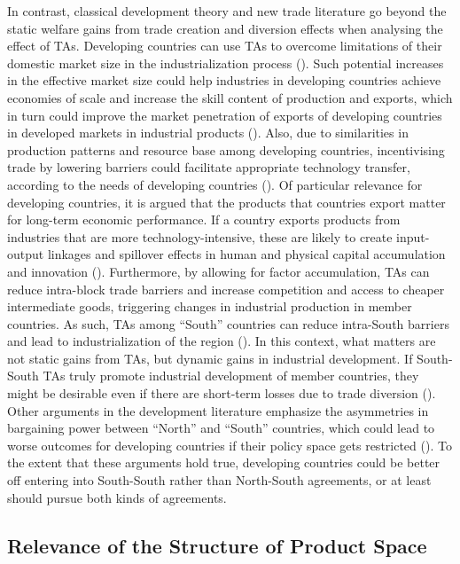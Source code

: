 %
In contrast, classical development theory and new trade literature go
beyond the static welfare gains from trade creation and diversion
effects when analysing the effect of TAs. Developing countries can use
TAs to overcome limitations of their domestic market size in the
industrialization process (\cite{dahi_preferential_2013}). Such potential
increases in the effective market size could help industries in
developing countries achieve economies of scale and increase the skill
content of production and exports, which in turn could improve the
market penetration of exports of developing countries in developed
markets in industrial products (\cite{fugazza_can_2006}). Also,
due to similarities in production patterns and resource base among
developing countries, incentivising trade by lowering barriers could
facilitate appropriate technology transfer, according to the needs of
developing countries (\cite{unido_industrial_2006}). Of particular relevance for
developing countries, it is argued that the products that countries
export matter for long-term economic performance. If a country exports
products from industries that are more technology-intensive, these are
likely to create input-output linkages and spillover effects in human
and physical capital accumulation and innovation (\cite{hausmann_what_2007}). Furthermore, by allowing for factor accumulation, TAs can
reduce intra-block trade barriers and increase competition and access to
cheaper intermediate goods, triggering changes in industrial production
in member countries. As such, TAs among ``South'' countries can reduce
intra-South barriers and lead to industrialization of the region (\cite{puga_trading_1998}). In this context, what matters are not static gains
from TAs, but dynamic gains in industrial development. If South-South
TAs truly promote industrial development of member countries, they might
be desirable even if there are short-term losses due to trade diversion
(\cite{dahi_preferential_2013}). Other arguments in the development literature
emphasize the asymmetries in bargaining power between ``North'' and
``South'' countries, which could lead to worse outcomes for developing
countries if their policy space gets restricted (\cite{thrasher_21st_2008}). To the extent that these arguments hold true, developing
countries could be better off entering into South-South rather than
North-South agreements, or at least should pursue both kinds of
agreements.

%
\subsection{Relevance of the Structure of Product Space}%
\label{subsec:RelevanceoftheStructureofProductSpace}%

